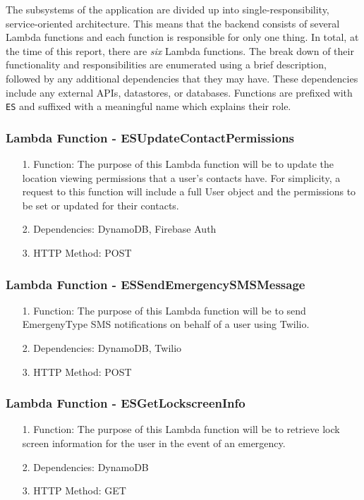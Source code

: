 \documentclass[10pt, a4paper]{article}
\begin{document}
The subsystems of the application are divided up into single-responsibility, service-oriented architecture. This means that the backend consists of several Lambda functions and each function is responsible for only one thing. In total, at the time of this report, there are \emph{six} Lambda functions. The break down of their functionality and responsibilities are enumerated using a brief description, followed by any additional dependencies that they may have. These dependencies include any external APIs, datastores, or databases. Functions are prefixed with \texttt{ES} and suffixed with a meaningful name which explains their role.

\subsubsection{Lambda Function - ESUpdateContactPermissions}
\begin{enumerate}
	\item[1.] Function: The purpose of this Lambda function will be to update the location viewing permissions that  a user's contacts have. For simplicity, a request to this function will include a full User object and the permissions to be set or updated for their contacts.
	\item[2.] Dependencies: DynamoDB, Firebase Auth
	\item[3.] HTTP Method: POST
\end{enumerate}

\subsubsection{Lambda Function - ESSendEmergencySMSMessage}
\begin{enumerate}
	\item[1.] Function: The purpose of this Lambda function will be to send EmergenyType SMS notifications on behalf of a user using Twilio.
	\item[2.] Dependencies: DynamoDB, Twilio
	\item[3.] HTTP Method: POST
\end{enumerate}

\subsubsection{Lambda Function - ESGetLockscreenInfo}
\begin{enumerate}
	\item[1.] Function: The purpose of this Lambda function will be to retrieve lock screen information for the user in the event of an emergency. 
	\item[2.] Dependencies: DynamoDB
	\item[3.] HTTP Method: GET
\end{enumerate}
\end{document}
